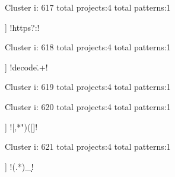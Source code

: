 Cluster i: 617
total projects:4
total patterns:1
\begin{multicols}{1}
\begin{description}[noitemsep,topsep=0pt]
\item [[4] ] \cverb!\s*https?:!
\end{description}
\end{multicols}







Cluster i: 618
total projects:4
total patterns:1
\begin{multicols}{1}
\begin{description}[noitemsep,topsep=0pt]
\item [[4] ] \cverb!decode\..+!
\end{description}
\end{multicols}







Cluster i: 619
total projects:4
total patterns:1
\begin{multicols}{1}
\end{multicols}







Cluster i: 620
total projects:4
total patterns:1
\begin{multicols}{1}
\begin{description}[noitemsep,topsep=0pt]
\item [[4] ] \cverb![,*")([\]]!
\end{description}
\end{multicols}







Cluster i: 621
total projects:4
total patterns:1
\begin{multicols}{1}
\begin{description}[noitemsep,topsep=0pt]
\item [[4] ] \cverb!(.*)_\d\d!
\end{description}
\end{multicols}







